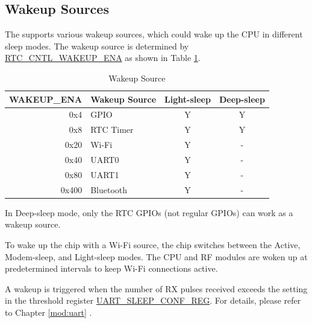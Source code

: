 \documentclass[main\_\_EN.tex]{subfiles}
\begin{document}
\subsection{Wakeup Sources}\label{sec:lpm-wakeup-source}

The \chipname{} supports various wakeup sources, which could wake up the CPU in different sleep modes. The wakeup source is determined by \hyperref[fielddesc:RTCCNTLWAKEUPENA]{RTC\_CNTL\_WAKEUP\_ENA} as shown in Table \ref{tab:lpm-wakeup-source}.

\begin{table}[H]
    \centering
    \caption{Wakeup Source}
    \label{tab:lpm-wakeup-source}
    \begin{threeparttable}
    \begin{tabular}{| r | l | c | c |}
    \hline
    \rowcolor{lightgray}
    \textbf{WAKEUP\_ENA} & \textbf{Wakeup Source} &  \textbf{Light-sleep} & \textbf{Deep-sleep}  \\\hline
    0x4 & GPIO\tnote{1} & Y & Y \\\hline
    0x8 & RTC Timer & Y & Y \\\hline
    0x20 & Wi-Fi\tnote{2} & Y & - \\\hline
    0x40 & UART0\tnote{3} & Y & - \\\hline
    0x80 & UART1\tnote{3} & Y & - \\\hline
    0x400 & Bluetooth & Y & - \\\hline
    \end{tabular}
    \begin{tablenotes}
        \item[1] In Deep-sleep mode, only the RTC GPIOs (not regular GPIOs) can work as a wakeup source.
        \item[2] To wake up the chip with a Wi-Fi source, the chip switches between the Active, Modem-sleep, and Light-sleep modes. The CPU and RF modules are woken up at predetermined intervals to keep Wi-Fi connections active.
        \item[3] A wakeup is triggered when the number of RX pulses received exceeds the setting in the threshold register \hyperref[regdesc:UARTSLEEPCONFREG]{UART\_SLEEP\_CONF\_REG}. For details, please refer to Chapter \ref{mod:uart} \textit{}.
    \end{tablenotes}
    \end{threeparttable}
\end{table}

\clearpage
\end{document}
